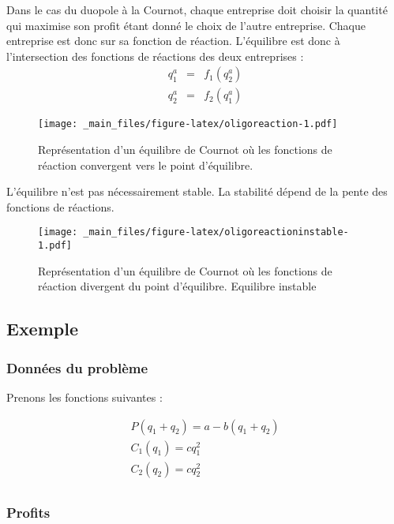 \documentclass[
]{book}
\theoremstyle{definition}
\theoremstyle{definition}
\theoremstyle{definition}
\theoremstyle{definition}
\theoremstyle{remark}
\begin{document}
Dans le cas du duopole à la Cournot, chaque entreprise doit choisir la quantité qui maximise son profit étant donné le choix de l'autre entreprise.
Chaque entreprise est donc sur sa fonction de réaction.
L'équilibre est donc à l'intersection des fonctions de réactions des deux entreprises :
\[
\begin{array}{rcl}
q_1^a&=&f_1(q_2^a)\\
q_2^a&=&f_2(q_1^a)
\end{array}
\]

\begin{figure}
\centering
\texttt{[image: \_main\_files/figure-latex/oligoreaction-1.pdf]}
\caption{\label{fig:oligoreaction}Représentation d'un équilibre de Cournot où les fonctions de réaction convergent vers le point d'équilibre.}
\end{figure}

L'équilibre n'est pas nécessairement stable.
La stabilité dépend de la pente des fonctions de réactions.

\begin{figure}
\centering
\texttt{[image: \_main\_files/figure-latex/oligoreactioninstable-1.pdf]}
\caption{\label{fig:oligoreactioninstable}Représentation d'un équilibre de Cournot où les fonctions de réaction divergent du point d'équilibre. Equilibre instable}
\end{figure}

\hypertarget{exemple}{%
\subsection{Exemple}\label{exemple}}

\hypertarget{donnuxe9es-du-probluxe8me}{%
\subsubsection{Données du problème}\label{donnuxe9es-du-probluxe8me}}

Prenons les fonctions suivantes :

\[
\begin{array}{l}
P(q_1+q_2) = a - b(q_1+q_2)\\
C_1(q_1) = cq^2_1 \\
C_2(q_2) = cq^2_2 \\
\end{array}
\]

\hypertarget{profits}{%
\subsubsection{Profits}\label{profits}}
\end{document}
